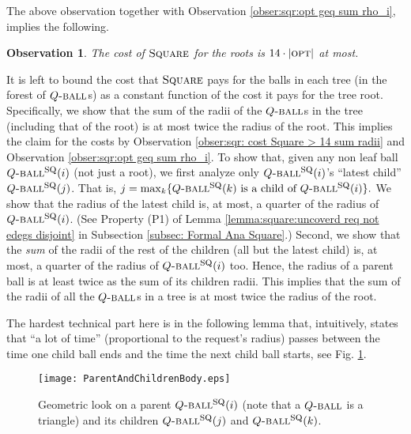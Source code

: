 \documentclass[11pt]{article}
\newtheorem{observation}[theorem]{Observation}
\newcommand{\opt}{\mbox{\textsc{opt}}}
\newcommand{\Square}[0]{\mbox{\sc Square}}
\newcommand{\SQball}[0]{Q{\mbox{\sc -ball}}^{\mbox{\sc sq}}}
\newcommand{\Qball}[0]{Q{\mbox{\sc -ball}}}
\begin{document}
\noindent The above observation together with Observation
\ref{obser:sqr:opt geq sum rho_i}, implies the following.

\vspace{0.2cm}
\begin{observation}
\label{obs:roots-cost}
The cost of $\Square$ for the roots is $14\cdot|\opt|$ at most.
\end{observation}
\vspace{0.2cm}

It is left to bound the cost that $\Square$ pays for the balls in each tree (in the forest of $\Qball$s) as a constant function of the cost it pays for the tree root.
Specifically, we show that the sum of the radii of the $\Qball$s in the tree (including that of the root) is at most twice the radius of the root.
This implies the claim for the costs by Observation \ref{obser:sqr: cost Square > 14 sum radii} and Observation \ref{obser:sqr:opt geq sum rho_i}.
To show that, given any non leaf ball $\SQball(i)$ (not just a root), we first analyze
only $\SQball(i)$'s ``latest child'' $\SQball(j)$.
That is,
$
j=\max_k\{\SQball(k) \mbox{ is a child of } \SQball(i)\}.
$
We show
that the radius of the latest child is, at most, a quarter of the radius of $\SQball(i)$.
(See Property (P1) of Lemma \ref{lemma:square:uncoverd req not edegs disjoint} in Subsection \ref{subsec: Formal Ana Square}.)
Second, we show that the {\em sum} of the radii of the rest of the children (all but the latest child) is, at most, a quarter of the radius of $\SQball(i)$ too.
Hence, the radius of a parent ball is at least twice as the sum of its children radii.
This implies that the sum of the radii of all the $\Qball$s in a tree is at most twice the radius of the root.



The hardest technical part here is in the following lemma that,
intuitively, states that ``a lot of time'' (proportional to the request's radius) passes between the time one child ball ends and the time the next child ball starts, see Fig. \ref{fig:sqr:ParentAndChildrenAA}.



\begin{figure*}
\begin{center}
\texttt{[image: ParentAndChildrenBody.eps]}
\end{center}
\caption{\sf Geometric look on a parent $\SQball(i)$ (note that a $\Qball$ is a triangle) and its children $\SQball(j)$ and $\SQball(k)$.
\label{fig:sqr:ParentAndChildrenAA}
}
\end{figure*}
\end{document}
